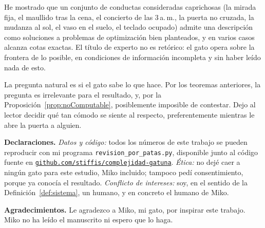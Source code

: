 \documentclass[11pt,a4paper]{article}
\theoremstyle{plain}
\theoremstyle{definition}
\theoremstyle{remark}
\numberwithin{equation}{section}
\begin{document}
He mostrado que un conjunto de conductas consideradas caprichosas (la mirada fija, el maullido tras la cena, el concierto de las 3\,a.\,m., la puerta no cruzada, la mudanza al sol, el vaso en el suelo, el teclado ocupado) admite una descripción como soluciones a problemas de optimización bien planteados, y en varios casos alcanza cotas exactas. El título de experto no es retórico: el gato opera sobre la frontera de lo posible, en condiciones de información incompleta y sin haber leído nada de esto.

La pregunta natural es si el gato sabe lo que hace. Por los teoremas anteriores, la pregunta es irrelevante para el resultado, y, por la Proposición~\ref{prop:noComputable}, posiblemente imposible de contestar. Dejo al lector decidir qué tan cómodo se siente al respecto, preferentemente mientras le abre la puerta a alguien.

\bigskip
\noindent\textbf{Declaraciones.} \emph{Datos y código:} todos los números de este trabajo se pueden reproducir con mi programa \texttt{revision\_por\_patas.py}, disponible junto al código fuente en \href{https://github.com/stiffis/complejidad-gatuna}{\nolinkurl{github.com/stiffis/complejidad-gatuna}}. \emph{Ética:} no dejé caer a ningún gato para este estudio, Miko incluido; tampoco pedí consentimiento, porque ya conocía el resultado. \emph{Conflicto de intereses:} soy, en el sentido de la Definición~\ref{def:sistema}, un humano, y en concreto el humano de Miko.

\medskip
\noindent\textbf{Agradecimientos.} Le agradezco a Miko, mi gato, por inspirar este trabajo. Miko no ha leído el manuscrito ni espero que lo haga.
\end{document}
